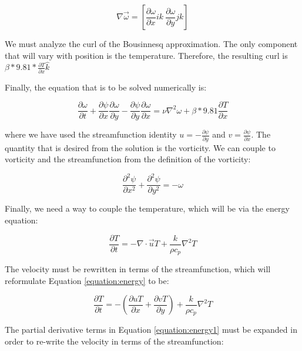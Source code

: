 \documentclass[journal]{new-aiaa}
\begin{document}
\begin{equation}
\label{equation:dyad}
\nabla \vec{\omega } =\left[ \frac{\partial \omega }{\partial x} ik\  \frac{\partial \omega }{\partial y} jk\right]  
\end{equation}

We must analyze the curl of the Bousinnesq approximation. The only component that will vary with position is the temperature. Therefore, the resulting curl is $\beta*9.81*\frac{\partial T}{\partial x}\hat{k}$

Finally, the equation that is to be solved numerically is:

\begin{equation}
\label{equation:main}
\frac{\partial \omega }{\partial t} +\frac{\partial \psi }{\partial x} \frac{\partial \omega }{\partial y} -\frac{\partial \psi }{\partial y} \frac{\partial \omega }{\partial x} =\nu \nabla^{2} \omega +\beta \ast 9.81\frac{\partial T}{\partial x} 
\end{equation}

where we have used the streamfunction identity $u=-\frac{\partial \psi}{\partial y}$ and $v=\frac{\partial \psi}{\partial x}$. The quantity that is desired from the solution is the vorticity. We can couple to vorticity and the streamfunction from the definition of the vorticity:

\begin{equation}
\label{equation:vorticity}
\frac{\partial^{2} \psi }{\partial x^{2}} +\frac{\partial^{2} \psi }{\partial y^{2}} =-\omega 
\end{equation}

Finally, we need a way to couple the temperature, which will be via the energy equation:

\begin{equation}
\label{equation:energy}
\frac{\partial T}{\partial t} =-\nabla \cdot \vec{u} T+\frac{k}{\rho c_{p}} \nabla^{2} T
\end{equation}

The velocity must be rewritten in terms of the streamfunction, which will reformulate Equation \ref{equation:energy} to be:

\begin{equation}
\label{equation:energy1}
\frac{\partial T}{\partial t} =-\left( \frac{\partial uT}{\partial x} +\frac{\partial vT}{\partial y} \right)  +\frac{k}{\rho c_{p}} \nabla^{2} T
\end{equation}

The partial derivative terms in Equation \ref{equation:energy1} must be expanded in order to re-write the velocity in terms of the streamfunction:
\end{document}
